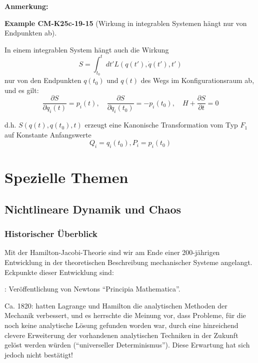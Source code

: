 \documentclass[10pt, letterpaper]{article}
\newcommand{\CustomHeading}[3]{%
  \par\medskip\noindent%
  \textbf{#1 #2} \textnormal{(#3)}.\enskip%
}
\newenvironment{EXA}[2]{\begin{unitbox}\CustomHeading{Example}{#1}{#2}}{\end{unitbox}}
\begin{document}
\textbf{Anmerkung:}



\begin{EXA}{CM-K25c-19-15}{Wirkung in integrablen Systemen hängt nur von Endpunkten ab}
In einem integrablen System hängt auch die Wirkung
\[
S = \int_{t_0}^t dt' L(q(t'), \dot{q}(t'), t')
\]
nur von den Endpunkten $q(t_0)$ und $q(t)$ des Wegs im Konfigurationsraum ab, und es gilt:
\[
\frac{\partial S}{\partial q_i(t)} = p_i(t), \quad \frac{\partial S}{\partial q_i(t_0)} = -p_i(t_0), \quad H + \frac{\partial S}{\partial t} = 0
\]

\noindent
d.h. $S(q(t), q(t_0), t)$ erzeugt eine Kanonische Transformation vom Typ $F_1$ auf Konstante Anfangswerte 
$$Q_i = q_i(t_0), P_i = p_i(t_0)$$
\end{EXA}


















\pagebreak

\section{Spezielle Themen}

\subsection{Nichtlineare Dynamik und Chaos}

\subsubsection*{Historischer Überblick}

Mit der Hamilton-Jacobi-Theorie sind wir am Ende einer 200-jährigen Entwicklung in der theoretischen Beschreibung mechanischer Systeme angelangt. Eckpunkte dieser Entwicklung sind:

: Veröffentlichung von Newtons ``Principia Mathematica''.

\noindent
Ca. 1820: hatten Lagrange und Hamilton die analytischen Methoden der Mechanik verbessert, und es herrschte die Meinung vor, dass Probleme, für die noch keine analytische Lösung gefunden worden war, durch eine hinreichend clevere Erweiterung der vorhandenen analytischen Techniken in der Zukunft gelöst werden würden (``universeller Determinismus''). Diese Erwartung hat sich jedoch nicht bestätigt!
\end{document}
